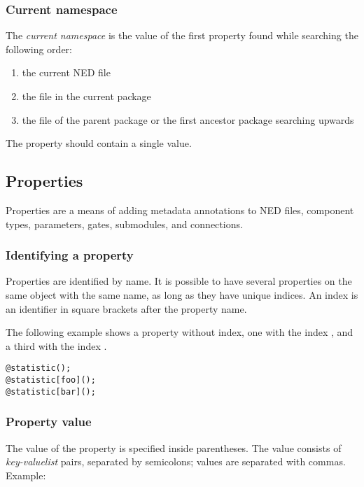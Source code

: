 \subsubsection{Current namespace}
\label{cha:ned-ref:current-namespace}

The \textit{current namespace} is the value of the first 
property found while searching the following order:
\begin{enumerate}
  \item the current NED file
  \item the  file in the current package
  \item the  file of the parent package or the first ancestor
        package searching upwards
\end{enumerate}

The  property should contain a single value.



\subsection{Properties}
\label{ch-ned-ref:sec:properties}

Properties are a means of adding metadata annotations to NED files, component types,
parameters, gates, submodules, and connections.

\subsubsection{Identifying a property}

Properties are identified by name. It is possible to have several properties
on the same object with the same name, as long as they have unique indices.
An index is an identifier in square brackets after the property name.

The following example shows a property without index, one with the index ,
and a third with the index .

\begin{verbatim}
@statistic();
@statistic[foo]();
@statistic[bar]();
\end{verbatim}


\subsubsection{Property value}

The value of the property is specified inside parentheses. The value consists of
\textit{key-valuelist} pairs, separated by semicolons; values are separated with commas.
Example:

